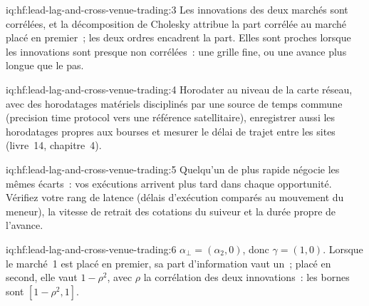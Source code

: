 \begin{solution}{iq:hf:lead-lag-and-cross-venue-trading:3}
Les innovations des deux marchés sont corrélées, et la décomposition de Cholesky attribue la part corrélée au marché placé en premier~;
les deux ordres encadrent la part. Elles sont proches lorsque les innovations sont presque non corrélées~: une grille fine, ou une avance plus longue que le pas.
\end{solution}

\begin{solution}{iq:hf:lead-lag-and-cross-venue-trading:4}
Horodater au niveau de la carte réseau, avec des horodatages matériels disciplinés par une source de temps commune (precision time protocol vers une référence satellitaire), enregistrer
aussi les horodatages propres aux bourses et mesurer le délai de trajet entre les sites (livre~14, chapitre~4).
\end{solution}

\begin{solution}{iq:hf:lead-lag-and-cross-venue-trading:5}
Quelqu'un de plus rapide négocie les mêmes écarts~: vos exécutions arrivent plus tard dans chaque opportunité. Vérifiez votre rang de latence (délais d'exécution comparés au mouvement du meneur), la
vitesse de retrait des cotations du suiveur et la durée propre de l'avance.
\end{solution}

\begin{solution}{iq:hf:lead-lag-and-cross-venue-trading:6}
$\alpha_\perp=(\alpha_2,0)$, donc $\gamma=(1,0)$. Lorsque le marché~1 est placé en premier, sa part d'information vaut un~; placé en second, elle vaut $1-\rho^2$, avec $\rho$
la corrélation des deux innovations~: les bornes sont $[1-\rho^2,1]$.
\end{solution}
